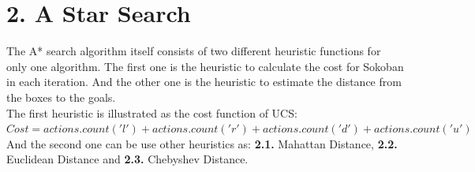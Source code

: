 \documentclass[english, a4paper,12pt]{article}
\begin{document}
\section*{2. A Star Search}
The A* search algorithm itself consists of two different heuristic functions for only one algorithm. The first one is the heuristic to calculate the cost for Sokoban in each iteration. And the other one is the heuristic to estimate the distance from the boxes to the goals.\\

The first heuristic is illustrated as the cost function of UCS:
\vspace*{5mm}\\
\hspace*{5mm}$Cost = actions.count('l') + actions.count('r') + actions.count('d') + actions.count('u')$
\\

And the second one can be use other heuristics as: \textbf{2.1.} Mahattan Distance, \textbf{2.2. } Euclidean Distance and \textbf{2.3. } Chebyshev Distance.
\newpage
\end{document}
